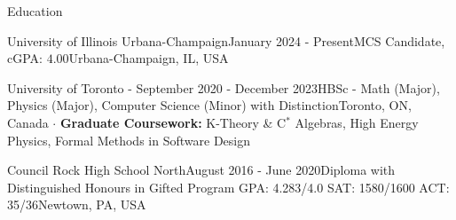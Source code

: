 \documentclass[UTF8]{resume} %
\begin{document}
\begin{rSection}{Education}
    
\begin{rSubsection}{University of Illinois Urbana-Champaign}{January 2024 - Present}{MCS Candidate, cGPA: \(4.00\)}{Urbana-Champaign, IL, USA}
\end{rSubsection}
\begin{rSubsection}{University of Toronto - }{September 2020 - December 2023}{HBSc - Math (Major), Physics (Major), Computer Science (Minor) with Distinction}{Toronto, ON, Canada}
    $\cdot$ \textbf{Graduate Coursework:} K-Theory \& C$^*$ Algebras, High Energy Physics, Formal Methods in Software Design
\end{rSubsection}
\begin{rSubsection}{Council Rock High School North}{August 2016 - June 2020}{Diploma with Distinguished Honours in Gifted Program GPA: 4.283/4.0  SAT: 1580/1600  ACT: 35/36}{Newtown, PA, USA}

\end{rSubsection}
\end{rSection}
\end{document}
